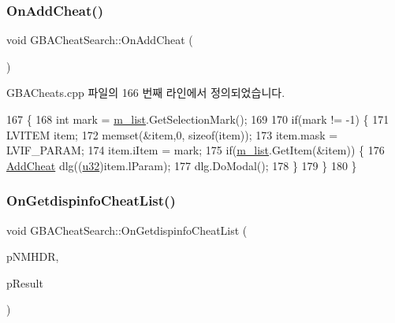 \subsubsection{\texorpdfstring{On\+Add\+Cheat()}{OnAddCheat()}}
{\footnotesize\ttfamily void G\+B\+A\+Cheat\+Search\+::\+On\+Add\+Cheat (\begin{DoxyParamCaption}{ }\end{DoxyParamCaption})\hspace{0.3cm}{\ttfamily [protected]}}



G\+B\+A\+Cheats.\+cpp 파일의 166 번째 라인에서 정의되었습니다.


\begin{DoxyCode}
167 \{
168   \textcolor{keywordtype}{int} mark = \mbox{\hyperlink{class_g_b_a_cheat_search_aab4be5c0e3c3436c738a43f466be0902}{m\_list}}.GetSelectionMark();
169   
170   \textcolor{keywordflow}{if}(mark != -1) \{
171     LVITEM item;
172     memset(&item,0, \textcolor{keyword}{sizeof}(item));
173     item.mask = LVIF\_PARAM;
174     item.iItem = mark;
175     \textcolor{keywordflow}{if}(\mbox{\hyperlink{class_g_b_a_cheat_search_aab4be5c0e3c3436c738a43f466be0902}{m\_list}}.GetItem(&item)) \{
176       \mbox{\hyperlink{class_add_cheat}{AddCheat}} dlg((\mbox{\hyperlink{_system_8h_a10e94b422ef0c20dcdec20d31a1f5049}{u32}})item.lParam);
177       dlg.DoModal();
178     \}
179   \}
180 \}
\end{DoxyCode}
\mbox{\label{class_g_b_a_cheat_search_a6ad35822df234eb7d2db23435381577e}} 
\subsubsection{\texorpdfstring{On\+Getdispinfo\+Cheat\+List()}{OnGetdispinfoCheatList()}}
{\footnotesize\ttfamily void G\+B\+A\+Cheat\+Search\+::\+On\+Getdispinfo\+Cheat\+List (\begin{DoxyParamCaption}\item[{N\+M\+H\+DR $\ast$}]{p\+N\+M\+H\+DR,  }\item[{L\+R\+E\+S\+U\+LT $\ast$}]{p\+Result }\end{DoxyParamCaption})\hspace{0.3cm}{\ttfamily [protected]}}



